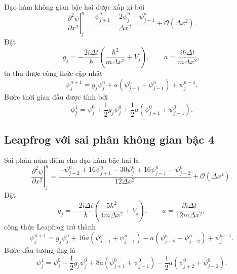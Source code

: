 \documentclass[12pt,a4paper]{article}
\begin{document}
Đạo hàm không gian bậc hai được xấp xỉ bởi
\begin{equation}
    \left.\frac{\partial^2\psi}{\partial x^2}\right|_j^n
    =\frac{\psi_{j+1}^n-2\psi_j^n+\psi_{j-1}^n}{\Delta x^2}
    +\mathcal O(\Delta x^2).
    \label{eq:space2}
\end{equation}
Đặt
\begin{equation}
    g_j=-\frac{2i\Delta t}{\hbar}
    \left(\frac{\hbar^2}{m\Delta x^2}+V_j\right),
    \qquad
    a=\frac{i\hbar\Delta t}{m\Delta x^2},
    \label{eq:ga2}
\end{equation}
ta thu được công thức cập nhật
\begin{equation}
    \boxed{
    \psi_j^{n+1}=g_j\psi_j^n
    +a\left(\psi_{j+1}^n+\psi_{j-1}^n\right)
    +\psi_j^{n-1}.}
    \label{eq:leapfrog2}
\end{equation}
Bước thời gian đầu được tính bởi
\begin{equation}
    \boxed{
    \psi_j^1=\psi_j^0+\frac{1}{2}g_j\psi_j^0
    +\frac{1}{2}a\left(\psi_{j+1}^0+\psi_{j-1}^0\right).}
    \label{eq:first2}
\end{equation}

\subsection{Leapfrog với sai phân không gian bậc 4}

Sai phân năm điểm cho đạo hàm bậc hai là
\begin{equation}
    \left.\frac{\partial^2\psi}{\partial x^2}\right|_j^n
    =\frac{-\psi_{j+2}^n+16\psi_{j+1}^n-30\psi_j^n
    +16\psi_{j-1}^n-\psi_{j-2}^n}{12\Delta x^2}
    +\mathcal O(\Delta x^4).
    \label{eq:space4}
\end{equation}
Đặt
\begin{equation}
    g_j=-\frac{2i\Delta t}{\hbar}
    \left(\frac{5\hbar^2}{4m\Delta x^2}+V_j\right),
    \qquad
    a=\frac{i\hbar\Delta t}{12m\Delta x^2},
    \label{eq:ga4}
\end{equation}
công thức Leapfrog trở thành
\begin{equation}
    \boxed{
    \psi_j^{n+1}=g_j\psi_j^n
    +16a\left(\psi_{j+1}^n+\psi_{j-1}^n\right)
    -a\left(\psi_{j+2}^n+\psi_{j-2}^n\right)
    +\psi_j^{n-1}.}
    \label{eq:leapfrog4}
\end{equation}
Bước đầu tương ứng là
\begin{equation}
    \boxed{
    \psi_j^1=\psi_j^0+\frac{1}{2}g_j\psi_j^0
    +8a\left(\psi_{j+1}^0+\psi_{j-1}^0\right)
    -\frac{1}{2}a\left(\psi_{j+2}^0+\psi_{j-2}^0\right).}
    \label{eq:first4}
\end{equation}
\end{document}
